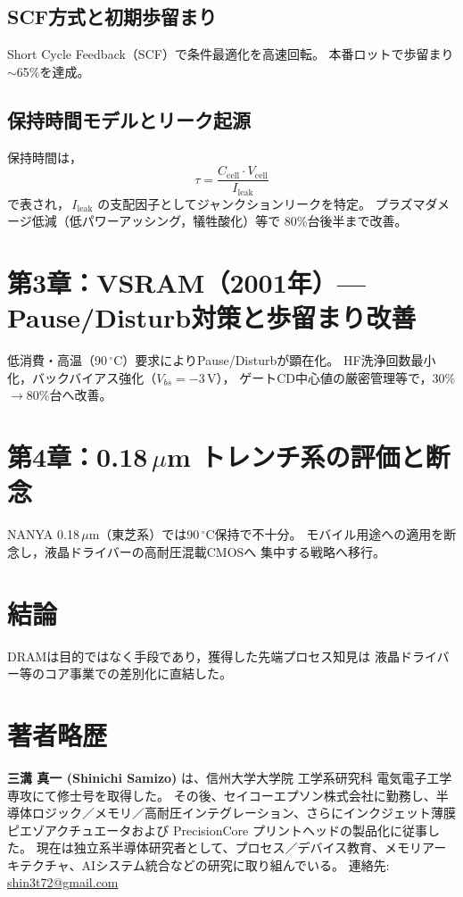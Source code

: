 \documentclass[conference]{IEEEtran}
\begin{document}
\subsection{SCF方式と初期歩留まり}
Short Cycle Feedback（SCF）で条件最適化を高速回転。
本番ロットで歩留まり$\sim$65\%を達成。

\subsection{保持時間モデルとリーク起源}
保持時間は，
\begin{equation}
\tau = \frac{C_{\mathrm{cell}} \cdot V_{\mathrm{cell}}}{I_{\mathrm{leak}}}
\end{equation}
で表され，\,$I_{\mathrm{leak}}$ の支配因子としてジャンクションリークを特定。
プラズマダメージ低減（低パワーアッシング，犠牲酸化）等で
80\%台後半まで改善。

\section{第3章：VSRAM（2001年）— Pause/Disturb対策と歩留まり改善}
低消費・高温（90\,$^\circ$C）要求によりPause/Disturbが顕在化。
HF洗浄回数最小化，バックバイアス強化（$V_{bs}=-3$\,V），
ゲートCD中心値の厳密管理等で，30\%$\rightarrow$80\%台へ改善。

\section{第4章：0.18\,\texorpdfstring{$\mu$m}{μm} トレンチ系の評価と断念}
NANYA 0.18\,$\mu$m（東芝系）では90\,$^\circ$C保持で不十分。
モバイル用途への適用を断念し，液晶ドライバーの高耐圧混載CMOSへ
集中する戦略へ移行。

\section{結論}
DRAMは目的ではなく手段であり，獲得した先端プロセス知見は
液晶ドライバー等のコア事業での差別化に直結した。




\section*{著者略歴}
\noindent\textbf{三溝 真一 (Shinichi Samizo)} は、信州大学大学院 工学系研究科 電気電子工学専攻にて修士号を取得した。
その後、セイコーエプソン株式会社に勤務し、半導体ロジック／メモリ／高耐圧インテグレーション、さらにインクジェット薄膜ピエゾアクチュエータおよび PrecisionCore プリントヘッドの製品化に従事した。
現在は独立系半導体研究者として、プロセス／デバイス教育、メモリアーキテクチャ、AIシステム統合などの研究に取り組んでいる。
連絡先: \href{mailto:shin3t72@gmail.com}{shin3t72@gmail.com}
\end{document}
